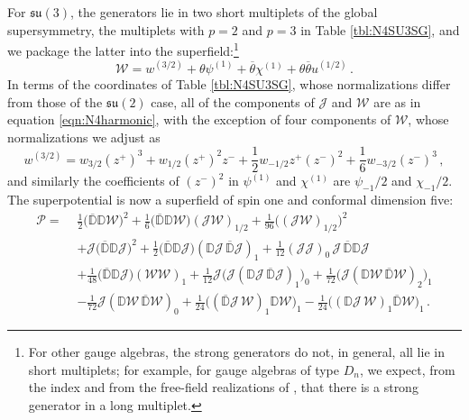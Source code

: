 \documentclass[12pt]{article}
\numberwithin{equation}{section}
\numberwithin{figure}{section}
\theoremstyle{plain}
\theoremstyle{definition}
\begin{document}
For $\mathfrak{su}(3)$, the generators lie in two short multiplets of the global supersymmetry, the multiplets with $p = 2$ and $p = 3$ in Table \ref{tbl:N4SU3SG}, and we package the latter into the superfield:\footnote{For other gauge algebras, the strong generators do not, in general, all lie in short multiplets; for example, for gauge algebras of type $D_n$, we expect, from the index and from the free-field realizations of \cite{Bonetti:2018fqz}, that there is a strong generator in a long multiplet.}
\begin{equation}\label{eqn:N4W}
    \mathcal{W} = w^{(3/2)} + \theta \psi^{(1)} + \overline{\theta} \chi^{(1)} + \theta \overline{\theta} u^{(1/2)} \,.
\end{equation}
In terms of the coordinates of Table \ref{tbl:N4SU3SG}, whose normalizations differ from those of the $\mathfrak{su}(2)$ case, all of the components of $\mathcal{J}$ and $\mathcal{W}$ are as in equation \eqref{eqn:N4harmonic}, with the exception of four components of $\mathcal{W}$, whose normalizations we adjust as
\begin{equation}
    w^{(3/2)} = w_{3/2} (z^+)^3 + w_{1/2} (z^+)^2 z^- + \frac{1}{2} w_{-1/2} z^+ (z^-)^2 + \frac{1}{6} w_{-3/2} (z^-)^3 \,,
\end{equation}
and similarly the coefficients of $(z^-)^2$ in $\psi^{(1)}$ and $\chi^{(1)}$ are $\psi_{-1}/2$ and $\chi_{-1}/2$. The superpotential is now a superfield of spin one and conformal dimension five:
\begin{equation}\label{eqn:N4superpotential}
  \begin{aligned}
    \mathcal{P} = \,\, & \frac{1}{2} \big( \overline{\mathbb{D}}\mathbb{D}\mathcal{W} \big)^2 + \frac{1}{6} \big( \overline{\mathbb{D}}\mathbb{D}\mathcal{W} \big) (\mathcal{J}\mathcal{W})_{1/2} + \frac{1}{96} \big( (\mathcal{J}\mathcal{W})_{1/2} \big)^2 \\
    & + \mathcal{J} \big( \overline{\mathbb{D}}\mathbb{D}\mathcal{J} \big)^2 + \frac{1}{2} \big( \overline{\mathbb{D}}\mathbb{D}\mathcal{J} \big) (\mathbb{D}\mathcal{J} \, \overline{\mathbb{D}}\mathcal{J})_1 + \frac{1}{12} (\mathcal{J}\mathcal{J})_0 \, \mathcal{J} \, \overline{\mathbb{D}}\mathbb{D}\mathcal{J} \\
    & + \frac{1}{48} \big( \overline{\mathbb{D}}\mathbb{D}\mathcal{J} \big) (\mathcal{W}\mathcal{W})_1 + \frac{1}{12} \mathcal{J} \big( \mathcal{J} (\mathbb{D}\mathcal{J} \, \overline{\mathbb{D}}\mathcal{J})_1 \big)_0 + \frac{1}{72} \big( \mathcal{J} (\mathbb{D}\mathcal{W} \, \overline{\mathbb{D}}\mathcal{W})_2 \big)_1 \\
    & - \frac{1}{72} \mathcal{J} (\mathbb{D}\mathcal{W} \, \overline{\mathbb{D}}\mathcal{W})_0 + \frac{1}{24} \big( (\overline{\mathbb{D}}\mathcal{J} \, \mathcal{W})_1 \mathbb{D}\mathcal{W} \big)_1 - \frac{1}{24} \big( (\mathbb{D}\mathcal{J} \, \mathcal{W})_1 \overline{\mathbb{D}}\mathcal{W} \big)_1 \,.
  \end{aligned}
\end{equation}
\end{document}
